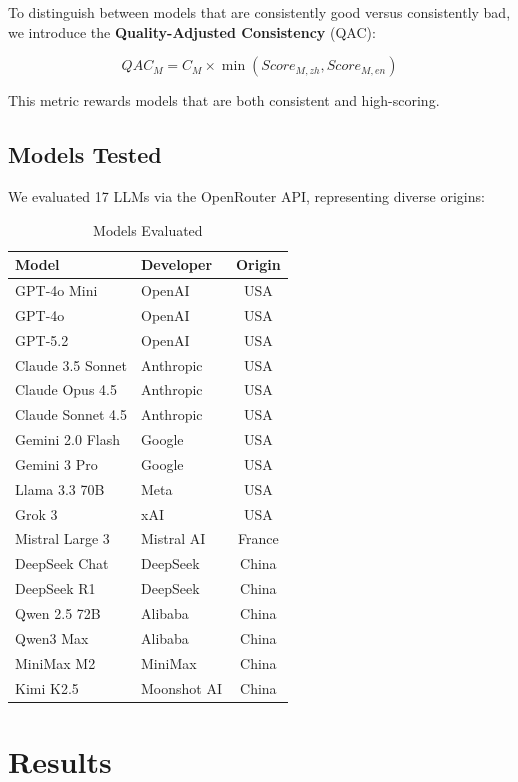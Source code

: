 \documentclass[11pt,a4paper]{article}
\begin{document}
To distinguish between models that are consistently good versus consistently bad, we introduce the \textbf{Quality-Adjusted Consistency} (QAC):

\begin{equation}
    QAC_M = C_M \times \min(Score_{M,zh}, Score_{M,en})
\end{equation}

This metric rewards models that are both consistent and high-scoring.

\subsection{Models Tested}

We evaluated 17 LLMs via the OpenRouter API, representing diverse origins:

\begin{table}[H]
\centering
\caption{Models Evaluated}
\begin{tabular}{llc}
\toprule
\textbf{Model} & \textbf{Developer} & \textbf{Origin} \\
\midrule
GPT-4o Mini & OpenAI & USA \\
GPT-4o & OpenAI & USA \\
GPT-5.2 & OpenAI & USA \\
Claude 3.5 Sonnet & Anthropic & USA \\
Claude Opus 4.5 & Anthropic & USA \\
Claude Sonnet 4.5 & Anthropic & USA \\
Gemini 2.0 Flash & Google & USA \\
Gemini 3 Pro & Google & USA \\
Llama 3.3 70B & Meta & USA \\
Grok 3 & xAI & USA \\
Mistral Large 3 & Mistral AI & France \\
DeepSeek Chat & DeepSeek & China \\
DeepSeek R1 & DeepSeek & China \\
Qwen 2.5 72B & Alibaba & China \\
Qwen3 Max & Alibaba & China \\
MiniMax M2 & MiniMax & China \\
Kimi K2.5 & Moonshot AI & China \\
\bottomrule
\end{tabular}
\label{tab:models}
\end{table}

\section{Results}
\end{document}
